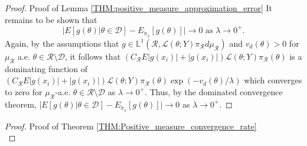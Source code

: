 \documentclass[10pt,fleqn]{article}
\DeclareMathOperator{\1}{\mathbbm{1}}
\begin{document}
{\begin{proof}{Proof of Lemma \ref{THM:positive_measure_approximation_error}}
It remains to be shown that $$\big| E[g(\theta)|\theta\in\mathcal{D}]-E_{\tilde{\pi}_\lambda}[g(\theta)]\big| \to 0 \text{ as }\lambda\to0^+.$$
Again, by the assumptions that $g\in\mathbb{L}^1(\mathcal{R},\mathcal{L}(\theta;Y)\pi_\mathcal{R}d\mu_\mathcal{R})$ and $v_d(\theta) >0$ for $\mu_\mathcal{R}$ a.e.  $\theta \in \mathcal{R}\setminus \mathcal{D}$, it follows that $(C_\mathcal{R}E|g(x_i)|+|g(x_i)|) \mathcal{L}(\theta;Y)\pi_\mathcal{R}(\theta)$ is a dominating function of $(C_\mathcal{R}E|g(x_i)|+|g(x_i)|) \mathcal{L}(\theta;Y)\pi_\mathcal{R}(\theta)\exp(-v_d(\theta)/\lambda )$ which converges to zero for $\mu_\mathcal{R}$-a.e. $\theta\in\mathcal{R}\setminus\mathcal{D}$ as $\lambda\to 0^+.$ Thus, by the dominated convergence theorem, $\big| E[g(\theta)|\theta\in\mathcal{D}]-E_{\tilde{\pi}_\lambda}[g(\theta)]\big|\to 0$ as $\lambda\to0^+.$

\end{proof}


\begin{proof}{Proof of Theorem \ref{THM:Positive_measure_convergence_rate}} \\


\end{proof}}
\end{document}
